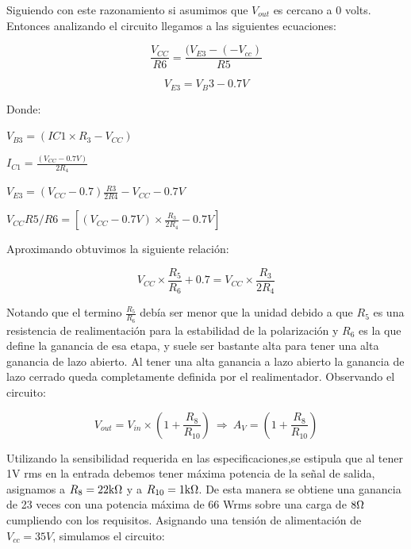 Siguiendo con este razonamiento si asumimos que $V_{out}$ es cercano a 0 volts. Entonces analizando el circuito llegamos a las siguientes ecuaciones:

\[
\frac{V_{CC}}{R6} = \frac{(V_{E3} - (-V_{cc})}{R5}
\]

$$
V_{E3} = V_B{3} - 0.7V
$$

Donde:
\begin{description}


\item $V_{B3} = (IC1 \times R_3 - V_{CC}) $
\item $I_{C1}=\frac{(V_{CC}-0.7V)}{2R_4}$
\item $V_{E3}= (V_{CC}-0.7) \frac{R3}{2R4} - V_{CC} - 0.7V$
\item $V_{CC} R5/R6 = \left[  (V_{CC}-0.7V) \times \frac{R_3}{2R_4} - 0.7V\right] $
\end{description}

Aproximando obtuvimos la siguiente relación:

$$ V_{CC} \times \frac{R_5}{R_6} + 0.7 =V_{CC} \times \frac{R_3}{2R_4} $$

Notando que el termino $\frac{R_5}{R_6}$ debía ser menor que la unidad debido a que $R_5$ es una resistencia de realimentación para la estabilidad de la polarización y $R_6$ es la que define la ganancia de esa etapa, y suele ser bastante alta para tener una alta ganancia de lazo abierto. 
Al tener una alta ganancia a lazo abierto la ganancia de lazo cerrado queda completamente definida por el realimentador. Observando el circuito:

$$ V_{out}= V_{in} \times \left(  1+\frac{R_8}{R_{10}} \right) ~ \Rightarrow ~ A_V= \left( 1+\frac{R_8}{R_{10}}\right) $$


Utilizando la sensibilidad requerida en las especificaciones,se estipula que al tener 1V rms en la entrada debemos tener máxima potencia de la señal de salida, asignamos a $R_8 = 22\kohm$ y a $R_{10} = 1\kohm$. De esta manera se obtiene una ganancia de 23 veces con una potencia máxima de 66 Wrms sobre una carga de $8 \ohm$ cumpliendo con los requisitos. Asignando una tensión de alimentación de $V_{cc}=35V$, simulamos el circuito:

